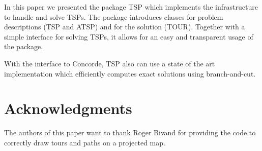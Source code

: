 \documentclass[10pt,a4paper,fleqn]{article}
\newcommand{\strong}[1]{{\normalfont\fontseries{b}\selectfont #1}}
\newcommand{\class}[1]{\mbox{\textsf{#1}}}
\newcommand{\pkg}[1]{\strong{#1}}
\begin{document}
In this paper we presented the package \pkg{TSP} which implements the
infrastructure to handle and solve TSPs. The package introduces classes for
problem descriptions (\class{TSP} and \class{ATSP}) and for the solution
(\class{TOUR}). Together with a simple interface for solving TSPs, 
it allows for an easy and transparent usage of the package.

With the interface to Concorde, \pkg{TSP} also can use a state of the art
implementation which efficiently computes exact solutions using branch-and-cut.

\section*{Acknowledgments}
The authors of this paper want to thank Roger Bivand for providing the 
code to correctly draw tours and paths on a projected map.

%


%
\end{document}
